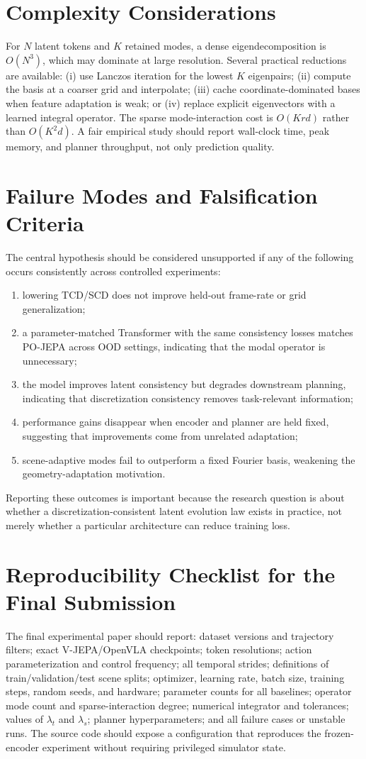 \documentclass{article}
\theoremstyle{plain}
\theoremstyle{definition}
\theoremstyle{remark}
\newcommand{\POJEPA}{\textsc{PO-JEPA}}
\begin{document}
\section{Complexity Considerations}
For $N$ latent tokens and $K$ retained modes, a dense eigendecomposition is $O(N^3)$, which may dominate at large resolution. Several practical reductions are available: (i) use Lanczos iteration for the lowest $K$ eigenpairs; (ii) compute the basis at a coarser grid and interpolate; (iii) cache coordinate-dominated bases when feature adaptation is weak; or (iv) replace explicit eigenvectors with a learned integral operator. The sparse mode-interaction cost is $O(Krd)$ rather than $O(K^2d)$. A fair empirical study should report wall-clock time, peak memory, and planner throughput, not only prediction quality.

\section{Failure Modes and Falsification Criteria}
\label{app:falsification}
The central hypothesis should be considered unsupported if any of the following occurs consistently across controlled experiments:
\begin{enumerate}
    \item lowering TCD/SCD does not improve held-out frame-rate or grid generalization;
    \item a parameter-matched Transformer with the same consistency losses matches \POJEPA{} across OOD settings, indicating that the modal operator is unnecessary;
    \item the model improves latent consistency but degrades downstream planning, indicating that discretization consistency removes task-relevant information;
    \item performance gains disappear when encoder and planner are held fixed, suggesting that improvements come from unrelated adaptation;
    \item scene-adaptive modes fail to outperform a fixed Fourier basis, weakening the geometry-adaptation motivation.
\end{enumerate}
Reporting these outcomes is important because the research question is about whether a discretization-consistent latent evolution law exists in practice, not merely whether a particular architecture can reduce training loss.

\section{Reproducibility Checklist for the Final Submission}
The final experimental paper should report: dataset versions and trajectory filters; exact V-JEPA/OpenVLA checkpoints; token resolutions; action parameterization and control frequency; all temporal strides; definitions of train/validation/test scene splits; optimizer, learning rate, batch size, training steps, random seeds, and hardware; parameter counts for all baselines; operator mode count and sparse-interaction degree; numerical integrator and tolerances; values of $\lambda_t$ and $\lambda_s$; planner hyperparameters; and all failure cases or unstable runs. The source code should expose a configuration that reproduces the frozen-encoder experiment without requiring privileged simulator state.
\end{document}
